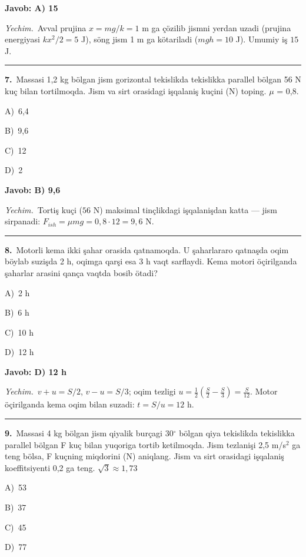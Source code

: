 \documentclass[11pt,a4paper]{article}
\newcommand{\opt}[2]{\hspace*{4mm}#1)\ #2\par}
\begin{document}
\noindent\colorbox{gray!12}{\parbox{\dimexpr\linewidth-2\fboxsep}{\textbf{Javob: A) 15}}}\par\smallskip
\noindent\textit{Yechim.}\ Avval prujina $x=mg/k=1$ m ga çözilib jismni yerdan uzadi (prujina energiyasi $kx^2/2=5$ J), söng jism 1 m ga kötariladi ($mgh=10$ J). Umumiy iş $15$ J.\par\par\medskip\hrule\medskip
{}\noindent\begin{minipage}{\linewidth}
\textbf{7.}\ Massasi 1,2 kg bölgan jism gorizontal tekislikda tekislikka parallel bölgan 56 N kuç bilan tortilmoqda. Jism va sirt orasidagi işqalaniş kuçini (N) toping. $\mu$ = 0,8.\par\smallskip
\opt{A}{6,4}
\opt{B}{9,6}
\opt{C}{12}
\opt{D}{2}
\end{minipage}\vspace{2pt}\par
\noindent\colorbox{gray!12}{\parbox{\dimexpr\linewidth-2\fboxsep}{\textbf{Javob: B) 9,6}}}\par\smallskip
\noindent\textit{Yechim.}\ Tortiş kuçi ($56$ N) maksimal tinçlikdagi işqalanişdan katta — jism sirpanadi: $F_{ish}=\mu mg=0{,}8\cdot12=9{,}6$ N.\par\par\medskip\hrule\medskip
{}\noindent\begin{minipage}{\linewidth}
\textbf{8.}\ Motorli kema ikki şahar orasida qatnamoqda. U şaharlararo qatnaşda oqim böylab suzişda 2 h, oqimga qarşi esa 3 h vaqt sarflaydi. Kema motori öçirilganda şaharlar arasini qança vaqtda bosib ötadi?\par\smallskip
\opt{A}{2 h}
\opt{B}{6 h}
\opt{C}{10 h}
\opt{D}{12 h}
\end{minipage}\vspace{2pt}\par
\noindent\colorbox{gray!12}{\parbox{\dimexpr\linewidth-2\fboxsep}{\textbf{Javob: D) 12 h}}}\par\smallskip
\noindent\textit{Yechim.}\ $v+u=S/2$, $v-u=S/3$; oqim tezligi $u=\frac12\left(\frac S2-\frac S3\right)=\frac{S}{12}$. Motor öçirilganda kema oqim bilan suzadi: $t=S/u=12$ h.\par\par\medskip\hrule\medskip
{}\noindent\begin{minipage}{\linewidth}
\textbf{9.}\ Massasi 4 kg bölgan jism qiyalik burçagi 30$^\circ$ bölgan qiya tekislikda tekislikka parallel bölgan F kuç bilan yuqoriga tortib ketilmoqda. Jism tezlanişi 2,5 m/s$^{2}$ ga teng bölsa, F kuçning miqdorini (N) aniqlang. Jism va sirt orasidagi işqalaniş koeffitsiyenti 0,2 ga teng. $\sqrt{3} \approx 1{,}73$\par\smallskip
\opt{A}{53}
\opt{B}{37}
\opt{C}{45}
\opt{D}{77}
\end{minipage}\vspace{2pt}\par
\end{document}
